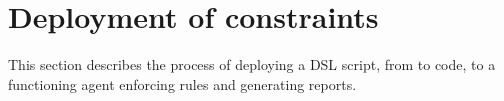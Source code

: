 \section{Deployment of constraints}

This section describes the process of deploying a DSL script, from to code, to a functioning agent enforcing rules and generating reports.




 



